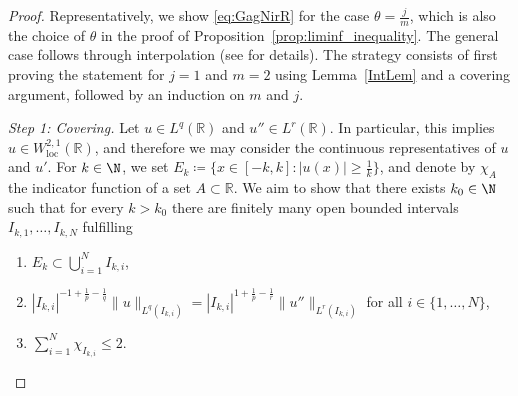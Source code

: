 \documentclass{article}
\newcommand{\eni}{\textit{(i)}}
\newcommand{\enii}{\textit{(ii)}}
\newcommand{\eniii}{\textit{(iii)}}
\numberwithin{figure}{section}
\newcommand{\R}{\mathbb{R}}
\numberwithin{equation}{section}
\begin{document}
\begin{proof}
Representatively, we show \eqref{eq:GagNirR} for the case $\theta = \frac jm$, which is also the choice of $\theta$ in the proof of Proposition~\ref{prop:liminf_inequality}. The general case follows through interpolation (see \cite{MolRosSou} for details). 
The strategy consists of first proving the statement for $j=1$ and $m=2$ using Lemma~\ref{IntLem} and a covering argument, followed by an induction on $m$ and $j$.

\textit{Step 1: Covering.} Let $u \in L^q(\R)$ and $u'' \in L^r(\R)$. In particular, this implies $u \in W^{2,1}_{\mathrm{loc}}(\R)$, and therefore we may consider the continuous representatives of $u$ and $u'$. For $k \in \N$, we set $E_k \coloneq \{x \in [-k,k]: |u(x)| \geq \frac 1k \}$, and denote by $\chi_A$ the indicator function of a set $A \subset \R$. We aim to show that there exists $k_0 \in \N$ such that for every $k > k_0$ there are finitely many open bounded intervals $I_{k,1},\ldots,I_{k,N}$ fulfilling 
\begin{enumerate}
    \item[\eni] $E_k \subset \bigcup_{i=1}^N I_{k,i}$,
    \item[\enii] $|I_{k,i}|^{-1+\frac 1p - \frac 1q} \|u\|_{L^q(I_{k,i})} = |I_{k,i}|^{1+\frac 1p - \frac 1r} \|u''\|_{L^r(I_{k,i})}$ for all $i \in \{1,\ldots,N\}$,
    \item[\eniii] $\sum_{i=1}^N \chi_{I_{k,i}} \leq 2$.
\end{enumerate}

\begin{figure}[htb]
\centering
{}
\end{figure}
\end{proof}
\end{document}
